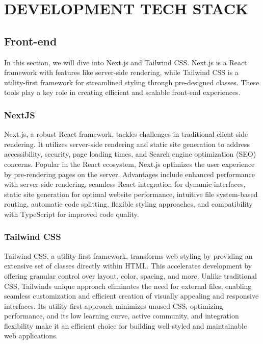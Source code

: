 \chapter{DEVELOPMENT TECH STACK}

\section{Front-end}


In this section, we will dive into Next.js and Tailwind CSS. Next.js is
a React framework with features like server-side rendering, while
Tailwind CSS is a utility-first framework for streamlined styling
through pre-designed classes. These tools play a key role in creating
efficient and scalable front-end experiences.


\subsection{NextJS}

Next.js, a robust React framework, tackles challenges in traditional
client-side rendering. It utilizes server-side rendering and static site
generation to address accessibility, security, page loading times, and
Search engine optimization (SEO) concerns. Popular in the React
ecosystem, Next.js optimizes the user experience by pre-rendering pages
on the server. Advantages include enhanced performance with server-side
rendering, seamless React integration for dynamic interfaces, static
site generation for optimal website performance, intuitive file
system-based routing, automatic code splitting, flexible styling
approaches, and compatibility with TypeScript for improved code quality.


\subsection{Tailwind CSS}

Tailwind CSS, a utility-first framework, transforms web styling by
providing an extensive set of classes directly within HTML. This
accelerates development by offering granular control over layout, color,
spacing, and more. Unlike traditional CSS, Tailwind\textquotesingle s
unique approach eliminates the need for external files, enabling
seamless customization and efficient creation of visually appealing and
responsive interfaces. Its utility-first approach minimizes unused CSS,
optimizing performance, and its low learning curve, active community,
and integration flexibility make it an efficient choice for building
well-styled and maintainable web applications.


